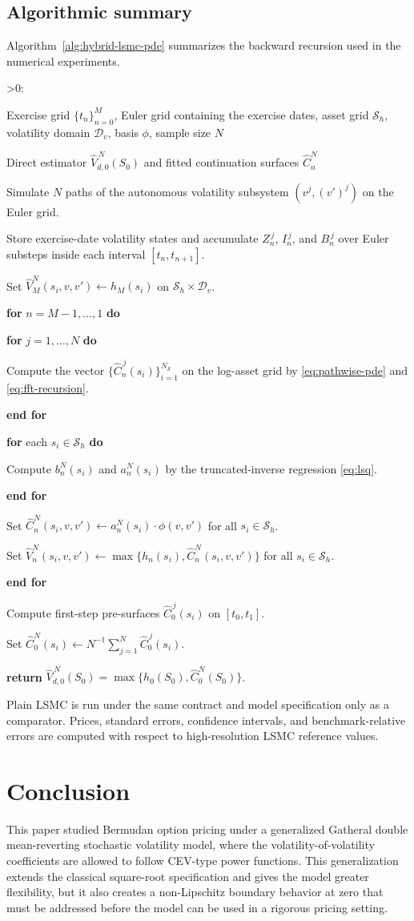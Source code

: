 \documentclass[pdflatex,sn-mathphys-num]{sn-jnl}
\makeatletter
\newcounter{ALG@line}
\newenvironment{algorithmic}[1][0]{%
  \setcounter{ALG@line}{0}%
  \def\ALG@freq{#1}%
  \begin{list}{\ifnum\ALG@freq>0\refstepcounter{ALG@line}\arabic{ALG@line}:\fi}{%
    \setlength{\leftmargin}{2.2em}%
    \setlength{\labelwidth}{1.8em}%
    \setlength{\labelsep}{0.4em}%
    \setlength{\itemsep}{2pt}%
    \setlength{\parsep}{0pt}%
    \setlength{\topsep}{3pt}%
  }%
}{\end{list}}
\newcommand{\Require}{\item[\textbf{Require:}]}
\newcommand{\Ensure}{\item[\textbf{Ensure:}]}
\newcommand{\State}{\item}
\newcommand{\For}[1]{\State \textbf{for} #1 \textbf{do}}
\newcommand{\EndFor}{\State \textbf{end for}}
\theoremstyle{thmstyleone}%
\theoremstyle{thmstylethree}%
\theoremstyle{thmstyletwo}%
\makeatother
\begin{document}
\subsection{Algorithmic summary}
\label{subsec:algorithmic-summary}
Algorithm~\ref{alg:hybrid-lsmc-pde} summarizes the backward recursion used in the numerical experiments.

\begin{algorithm}
\caption{Hybrid LSMC--PDE recursion}\label{alg:hybrid-lsmc-pde}
\begin{algorithmic}[1]
\Require Exercise grid $\{t_n\}_{n=0}^M$, Euler grid containing the exercise dates, asset grid $\mathcal S_h$, volatility domain $\mathcal D_v$, basis $\phi$, sample size $N$
\Ensure Direct estimator $\widehat V_{d,0}^{\,N}(S_0)$ and fitted continuation surfaces $\widehat C_n^N$
\State Simulate $N$ paths of the autonomous volatility subsystem $(v^j,(v')^j)$ on the Euler grid.
\State Store exercise-date volatility states and accumulate $Z_n^{\,j}$, $I_n^{\,j}$, and $B_n^{\,j}$ over Euler substeps inside each interval $[t_n,t_{n+1}]$.
\State Set $\widehat V_M^N(s_i,v,v')\gets h_M(s_i)$ on $\mathcal S_h\times\mathcal D_v$.
\For{$n=M-1,\ldots,1$}
    \For{$j=1,\ldots,N$}
        \State Compute the vector $\{\widehat C_n^{\,j}(s_i)\}_{i=1}^{N_{\mathcal S}}$ on the log-asset grid by \eqref{eq:pathwise-pde} and \eqref{eq:fft-recursion}.
    \EndFor
    \For{each $s_i\in\mathcal S_h$}
        \State Compute $b_n^N(s_i)$ and $a_n^N(s_i)$ by the truncated-inverse regression \eqref{eq:lsq}.
    \EndFor
    \State Set $\widehat C_n^N(s_i,v,v')\gets a_n^N(s_i)\cdot\phi(v,v')$ for all $s_i\in\mathcal S_h$.
    \State Set $\widehat V_n^N(s_i,v,v')\gets\max\{h_n(s_i),\widehat C_n^N(s_i,v,v')\}$ for all $s_i\in\mathcal S_h$.
\EndFor
\State Compute first-step pre-surfaces $\widehat C_0^{\,j}(s_i)$ on $[t_0,t_1]$.
\State Set $\widehat C_0^N(s_i)\gets N^{-1}\sum_{j=1}^N\widehat C_0^{\,j}(s_i)$.
\State \textbf{return} $\widehat V_{d,0}^{\,N}(S_0)=\max\{h_0(S_0),\widehat C_0^N(S_0)\}$.
\end{algorithmic}
\end{algorithm}

Plain LSMC is run under the same contract and model specification only as a comparator. Prices, standard errors, confidence intervals, and benchmark-relative errors are computed with respect to high-resolution LSMC reference values.




\section{Conclusion}\label{sec:conclusion}
This paper studied Bermudan option pricing under a generalized Gatheral double mean-reverting stochastic volatility model, where the volatility-of-volatility coefficients are allowed to follow CEV-type power functions. This generalization extends the classical square-root specification and gives the model greater flexibility, but it also creates a non-Lipschitz boundary behavior at zero that must be addressed before the model can be used in a rigorous pricing setting.
\end{document}

